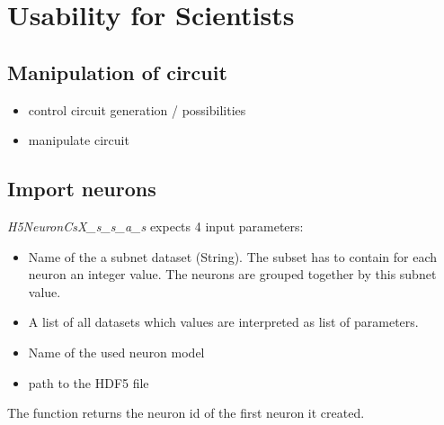 




\newpage
\section{Usability for Scientists}

\subsection{Manipulation of circuit}

\begin{itemize}
      \item control circuit generation / possibilities
      \item  manipulate circuit
\end{itemize}

\subsection{Import neurons}
\emph{H5NeuronCsX\_s\_s\_a\_s} expects 4 input parameters:
\begin{itemize}
      \item Name of the a subnet dataset (String).
The subset has to contain for each neuron an integer value.
The neurons are grouped together by this subnet value.

      \item A list of all datasets which values are interpreted as list of parameters.
      
      \item Name of the used neuron model
      
      \item path to the HDF5 file 
\end{itemize}
The function returns the neuron id of the first neuron it created.

